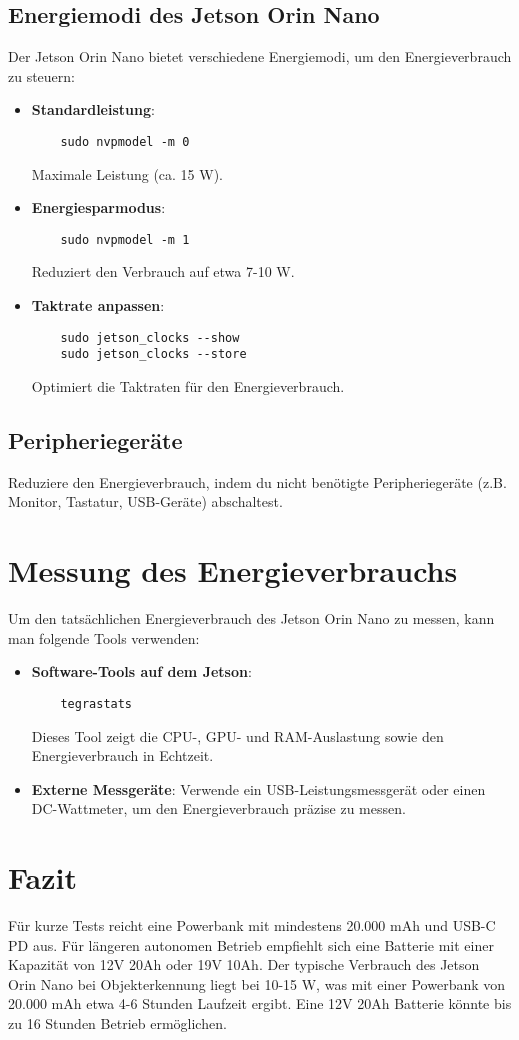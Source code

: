 \documentclass[12pt]{article}
\begin{document}
\subsection{Energiemodi des Jetson Orin Nano}
Der Jetson Orin Nano bietet verschiedene Energiemodi, um den Energieverbrauch zu steuern:
\begin{itemize}
    \item \textbf{Standardleistung}: 
    \begin{verbatim}
    sudo nvpmodel -m 0
    \end{verbatim}
    Maximale Leistung (ca. 15 W).
    
    \item \textbf{Energiesparmodus}: 
    \begin{verbatim}
    sudo nvpmodel -m 1
    \end{verbatim}
    Reduziert den Verbrauch auf etwa 7-10 W.
    
    \item \textbf{Taktrate anpassen}: 
    \begin{verbatim}
    sudo jetson_clocks --show
    sudo jetson_clocks --store
    \end{verbatim}
    Optimiert die Taktraten für den Energieverbrauch.
\end{itemize}

\subsection{Peripheriegeräte}
Reduziere den Energieverbrauch, indem du nicht benötigte Peripheriegeräte (z.B. Monitor, Tastatur, USB-Geräte) abschaltest.

\clearpage
\section{Messung des Energieverbrauchs}
Um den tatsächlichen Energieverbrauch des Jetson Orin Nano zu messen, kann man folgende Tools verwenden:
\begin{itemize}
    \item \textbf{Software-Tools auf dem Jetson}:
    \begin{verbatim}
    tegrastats
    \end{verbatim}
    Dieses Tool zeigt die CPU-, GPU- und RAM-Auslastung sowie den Energieverbrauch in Echtzeit.

    \item \textbf{Externe Messgeräte}: 
    Verwende ein USB-Leistungsmessgerät oder einen DC-Wattmeter, um den Energieverbrauch präzise zu messen.
\end{itemize}

\section{Fazit}
Für kurze Tests reicht eine Powerbank mit mindestens 20.000 mAh und USB-C PD aus. Für längeren autonomen Betrieb empfiehlt sich eine Batterie mit einer Kapazität von 12V 20Ah oder 19V 10Ah. Der typische Verbrauch des Jetson Orin Nano bei Objekterkennung liegt bei 10-15 W, was mit einer Powerbank von 20.000 mAh etwa 4-6 Stunden Laufzeit ergibt. Eine 12V 20Ah Batterie könnte bis zu 16 Stunden Betrieb ermöglichen.
\end{document}
